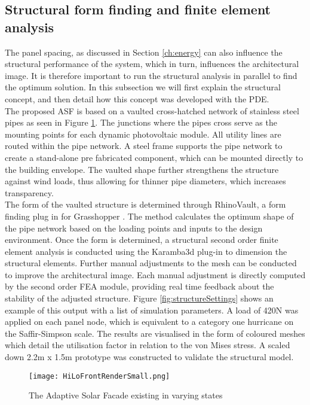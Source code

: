 \subsection{Structural form finding and finite element analysis}

The panel spacing, as discussed in Section \ref{ch:energy} can also influence the structural performance of the system, which in turn, influences the architectural image. It is therefore important to run the structural analysis in parallel to find the optimum solution. In this subsection we will first explain the structural concept, and then detail how this concept was developed with the PDE.\\

The proposed ASF is based on a vaulted cross-hatched network of stainless steel pipes as seen in Figure \ref{fig:structure}. The junctions where the pipes cross serve as the mounting points for each dynamic photovoltaic module. All utility lines are routed within the pipe network. A steel frame supports the pipe network to create a stand-alone pre fabricated component, which can be mounted directly to the building envelope. The vaulted shape further strengthens the structure against wind loads, thus allowing for thinner pipe diameters, which increases transparency. \\


The form of the vaulted structure is determined through RhinoVault, a form finding plug in for Grasshopper \cite{Rippmann2012}. The method calculates the optimum shape of the pipe network based on the loading points and inputs to the design environment. Once the form is determined, a structural second order finite element analysis is conducted using the Karamba3d plug-in \cite{karamba} to dimension the structural elements. Further manual adjustments to the mesh can be conducted to improve the architectural image. Each manual adjustment is directly computed by the second order FEA module, providing real time feedback about the stability of the adjusted structure.  Figure \ref{fig:structureSettings} shows an example of this output with a list of simulation parameters. A load of 420N was applied on each panel node, which is equivalent to a category one hurricane on the Saffir-Simpson scale. The results are visualised in the form of coloured meshes which detail the utilisation factor in relation to the von Mises stress. A scaled down 2.2m x 1.5m prototype was constructed to validate the structural model. 

\begin{figure}
\begin{center}
\texttt{[image: HiLoFrontRenderSmall.png]}
\caption{The Adaptive Solar Facade existing in varying states}
\label{fig:structure}
\end{center}
\end{figure}

